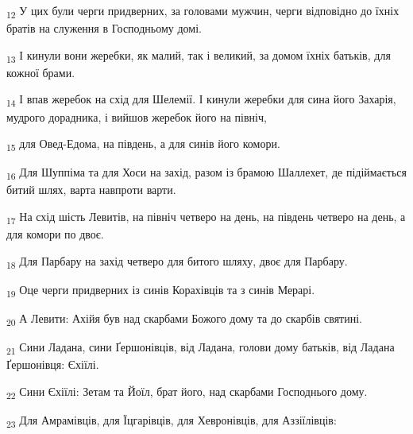 \begin{tcolorbox}
\textsubscript{12} У цих були черги придверних, за головами мужчин, черги відповідно до їхніх братів на служення в Господньому домі.
\end{tcolorbox}
\begin{tcolorbox}
\textsubscript{13} І кинули вони жеребки, як малий, так і великий, за домом їхніх батьків, для кожної брами.
\end{tcolorbox}
\begin{tcolorbox}
\textsubscript{14} І впав жеребок на схід для Шелемії. І кинули жеребки для сина його Захарія, мудрого дорадника, і вийшов жеребок його на північ,
\end{tcolorbox}
\begin{tcolorbox}
\textsubscript{15} для Овед-Едома, на південь, а для синів його комори.
\end{tcolorbox}
\begin{tcolorbox}
\textsubscript{16} Для Шуппіма та для Хоси на захід, разом із брамою Шаллехет, де підіймається битий шлях, варта навпроти варти.
\end{tcolorbox}
\begin{tcolorbox}
\textsubscript{17} На схід шість Левитів, на північ четверо на день, на південь четверо на день, а для комори по двоє.
\end{tcolorbox}
\begin{tcolorbox}
\textsubscript{18} Для Парбару на захід четверо для битого шляху, двоє для Парбару.
\end{tcolorbox}
\begin{tcolorbox}
\textsubscript{19} Оце черги придверних із синів Корахівців та з синів Мерарі.
\end{tcolorbox}
\begin{tcolorbox}
\textsubscript{20} А Левити: Ахійя був над скарбами Божого дому та до скарбів святині.
\end{tcolorbox}
\begin{tcolorbox}
\textsubscript{21} Сини Ладана, сини Ґершонівців, від Ладана, голови дому батьків, від Ладана Ґершонівця: Єхіїлі.
\end{tcolorbox}
\begin{tcolorbox}
\textsubscript{22} Сини Єхіїлі: Зетам та Йоїл, брат його, над скарбами Господнього дому.
\end{tcolorbox}
\begin{tcolorbox}
\textsubscript{23} Для Амрамівців, для Їцгарівців, для Хевронівців, для Аззіїлівців:
\end{tcolorbox}
